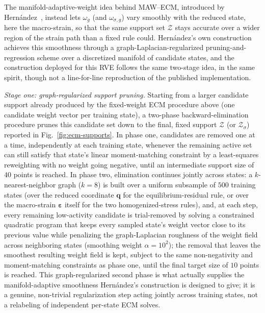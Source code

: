 \documentclass[10pt,a4paper]{article}
\begin{document}
The manifold-adaptive-weight idea behind MAW--ECM, introduced by
Hern\'andez~\cite{HernandezMAWECM}, instead lets $\omega_g$ (and
$\omega_{\sigma,g}$) vary smoothly with the reduced state, here the
macro-strain, so that the same support set $\mathcal Z$ stays accurate
over a wider region of the strain path than a fixed rule could.
Hern\'andez's own construction achieves this smoothness through a
graph-Laplacian-regularized pruning-and-regression scheme over a
discretized manifold of candidate states, and the construction deployed
for this RVE follows the same two-stage idea, in the same spirit,
though not a line-for-line reproduction of the published implementation.

\emph{Stage one: graph-regularized support pruning.} Starting from a
larger candidate support already produced by the fixed-weight ECM
procedure above (one candidate weight vector per training state), a
two-phase backward-elimination procedure prunes this candidate set down
to the final, fixed support $\mathcal Z$ (or $\mathcal Z_\sigma$)
reported in Fig.~\ref{fig:ecm-supports}. In phase one, candidates are
removed one at a time, independently at each training state, whenever
the remaining active set can still satisfy that state's linear
moment-matching constraint by a least-squares reweighting with no
weight going negative, until an intermediate support size of $40$
points is reached. In phase two, elimination continues jointly across
states: a $k$-nearest-neighbor graph ($k=8$) is built over a uniform
subsample of $500$ training states (over the reduced coordinate $\bm
q$ for the equilibrium-residual rule, or over the macro-strain
$\bm\varepsilon$ itself for the two homogenized-stress rules), and, at
each step, every remaining low-activity candidate is trial-removed by
solving a constrained quadratic program that keeps every sampled
state's weight vector close to its previous value while penalizing the
graph-Laplacian roughness of the weight field across neighboring states
(smoothing weight $\alpha=10^2$); the removal that leaves the smoothest
resulting weight field is kept, subject to the same non-negativity and
moment-matching constraints as phase one, until the final target size
of $10$ points is reached. This graph-regularized second phase is what
actually supplies the manifold-adaptive smoothness Hern\'andez's
construction is designed to give; it is a genuine, non-trivial
regularization step acting jointly across training states, not a
relabeling of independent per-state ECM solves.
\end{document}
